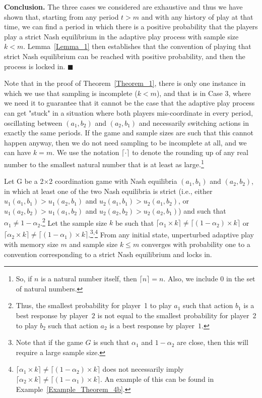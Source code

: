 {\bf Conclusion.} The three cases we considered are exhaustive and thus we have shown that, starting  from any period $t>m$ and with any history of play at that time, we can find a period in which there is a positive probability that the players play a strict Nash equilibrium in the adaptive play process with sample size $k<m$. Lemma~\ref{Lemma_1} then establishes that the convention of playing that strict Nash equilibrium can be reached with positive probability, and then the process is locked in.
$\blacksquare$

\medskip
Note that in the proof of Theorem~\ref{Theorem_1}, there is only one instance in which we use that sampling is incomplete ($k<m$), and that is in Case 3, where we need it to guarantee that it cannot be the case that the adaptive play process can get "stuck" in a situation where both players mis-coordinate in every period, oscillating between $(a_1,b_2)$ and $(a_2,b_1)$ and necessarily switching actions in exactly the same periods. 
%
If the game and sample sizes are such that this cannot happen anyway, then we do not need sampling to be incomplete at all, and we can have $k=m$. 
We use the notation $\lceil\cdot\rceil$ to denote the rounding up of any real number to the smallest natural number that is at least as large.\footnote{So, if $n$ is a natural number itself, then $\lceil n\rceil=n$. Also, we include $0$ in the set of natural numbers.}





\begin{theorem}\label{Theorem_2}
Let G be a 2$\times$2 coordination game with Nash equilibria $(a_1,b_1)$ and $(a_2,b_2)$,  
in which at least one of the two Nash equilibria is strict (i.e., either $u_1(a_1,b_1) > u_1(a_2,b_1)$ and $u_2(a_1,b_1) > u_2(a_1,b_2)$, or $u_1(a_2,b_2) > u_1(a_1,b_2)$ and $u_2(a_2,b_2) > u_2(a_2,b_1)$)  
%
and such that $\alpha_1\neq 1-\alpha_2$.\footnote{Thus, the smallest probability for player~1 to play $a_1$ such that action $b_1$ is a best response by player~$2$ is not equal to the smallest probability for player~2 to play $b_2$ such that action $a_2$ is a best response by player~$1$.} 
%
Let the sample size $k$ be such that $\lceil\alpha_1\times k\rceil \neq \lceil (1-\alpha_2)\times k\rceil$ or $\lceil\alpha_2\times k\rceil \neq \lceil (1-\alpha_1)\times k\rceil$.\footnote{Note that if the game $G$ is such that $\alpha_1$ and $1-\alpha_2$ are close, then this will require a large sample size.}\textsuperscript{,}\footnote{$\lceil\alpha_1\times k\rceil \neq \lceil (1-\alpha_2)\times k\rceil$ does not necessarily imply $\lceil\alpha_2\times k\rceil \neq \lceil (1-\alpha_1)\times k\rceil$. An example of this can be found in Example~\ref{Example_Theorem_4b}.}
From any initial state, unperturbed adaptive play with memory size $m$ and sample size $k \leq m$ converges with probability one to a convention corresponding to a strict Nash equilibrium and locks in.
\end{theorem}

